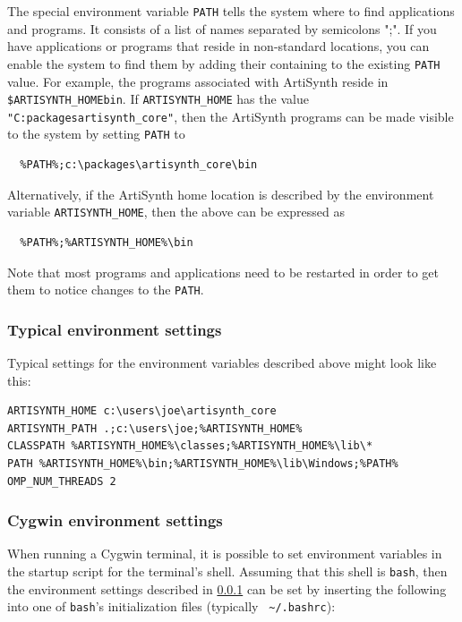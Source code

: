 The special environment variable {\tt PATH} tells the system where to find
applications and programs. It consists of a list of \directory names
separated by semicolons ";". If you have applications or programs that
reside in non-standard locations, you can enable the system to find
them by adding their containing \directory to the existing {\tt PATH}
value. For example, the programs associated with ArtiSynth reside in
{\tt \$ARTISYNTH\_HOME\SEP bin}. If {\tt ARTISYNTH\_HOME} has the value
{\tt "C:\SEP packages\SEP artisynth\_core"}, then the ArtiSynth programs
can be made visible to the system by setting {\tt PATH} to

\begin{verbatim}
  %PATH%;c:\packages\artisynth_core\bin
\end{verbatim}

Alternatively, if the ArtiSynth home location is described by
the environment variable {\tt ARTISYNTH\_HOME}, then the
above can be expressed as

\begin{verbatim}
  %PATH%;%ARTISYNTH_HOME%\bin
\end{verbatim}

Note that most programs and applications need to be restarted in order
to get them to notice changes to the {\tt PATH}.

\subsubsection{Typical environment settings}
\label{TypicalEnvironment}

Typical settings for the environment variables described above might
look like this:

\begin{lstlisting}[]
ARTISYNTH_HOME c:\users\joe\artisynth_core
ARTISYNTH_PATH .;c:\users\joe;%ARTISYNTH_HOME%
CLASSPATH %ARTISYNTH_HOME%\classes;%ARTISYNTH_HOME%\lib\*
PATH %ARTISYNTH_HOME%\bin;%ARTISYNTH_HOME%\lib\Windows;%PATH%
OMP_NUM_THREADS 2
\end{lstlisting}

\subsubsection{Cygwin environment settings}
\label{CygwinEnvironmentSettings}

When running a Cygwin terminal, it is possible to set environment
variables in the startup script for the terminal's shell. Assuming
that this shell is {\tt bash}, then the environment settings described
in \ref{TypicalEnvironment} can be set by inserting the following
into one of {\tt bash}'s initialization files (typically {\tt
\textasciitilde/.bashrc}):

